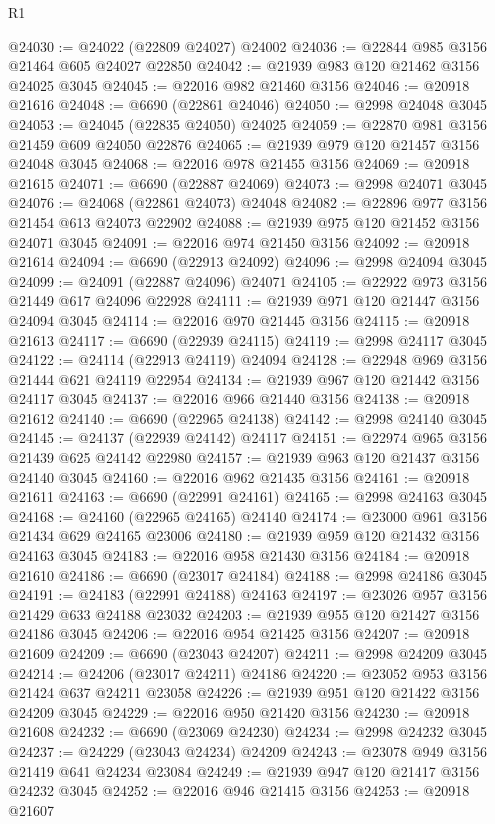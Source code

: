 \begin{lexlean}{R1}
\begin{coremodule}
@24030 := @24022 (@22809 @24027) @24002
@24036 := @22844 @985 @3156 @21464 @605 @24027 @22850
@24042 := @21939 @983 @120 @21462 @3156 @24025 @3045
@24045 := @22016 @982 @21460 @3156
@24046 := @20918 @21616
@24048 := @6690 (@22861 @24046)
@24050 := @2998 @24048 @3045
@24053 := @24045 (@22835 @24050) @24025
@24059 := @22870 @981 @3156 @21459 @609 @24050 @22876
@24065 := @21939 @979 @120 @21457 @3156 @24048 @3045
@24068 := @22016 @978 @21455 @3156
@24069 := @20918 @21615
@24071 := @6690 (@22887 @24069)
@24073 := @2998 @24071 @3045
@24076 := @24068 (@22861 @24073) @24048
@24082 := @22896 @977 @3156 @21454 @613 @24073 @22902
@24088 := @21939 @975 @120 @21452 @3156 @24071 @3045
@24091 := @22016 @974 @21450 @3156
@24092 := @20918 @21614
@24094 := @6690 (@22913 @24092)
@24096 := @2998 @24094 @3045
@24099 := @24091 (@22887 @24096) @24071
@24105 := @22922 @973 @3156 @21449 @617 @24096 @22928
@24111 := @21939 @971 @120 @21447 @3156 @24094 @3045
@24114 := @22016 @970 @21445 @3156
@24115 := @20918 @21613
@24117 := @6690 (@22939 @24115)
@24119 := @2998 @24117 @3045
@24122 := @24114 (@22913 @24119) @24094
@24128 := @22948 @969 @3156 @21444 @621 @24119 @22954
@24134 := @21939 @967 @120 @21442 @3156 @24117 @3045
@24137 := @22016 @966 @21440 @3156
@24138 := @20918 @21612
@24140 := @6690 (@22965 @24138)
@24142 := @2998 @24140 @3045
@24145 := @24137 (@22939 @24142) @24117
@24151 := @22974 @965 @3156 @21439 @625 @24142 @22980
@24157 := @21939 @963 @120 @21437 @3156 @24140 @3045
@24160 := @22016 @962 @21435 @3156
@24161 := @20918 @21611
@24163 := @6690 (@22991 @24161)
@24165 := @2998 @24163 @3045
@24168 := @24160 (@22965 @24165) @24140
@24174 := @23000 @961 @3156 @21434 @629 @24165 @23006
@24180 := @21939 @959 @120 @21432 @3156 @24163 @3045
@24183 := @22016 @958 @21430 @3156
@24184 := @20918 @21610
@24186 := @6690 (@23017 @24184)
@24188 := @2998 @24186 @3045
@24191 := @24183 (@22991 @24188) @24163
@24197 := @23026 @957 @3156 @21429 @633 @24188 @23032
@24203 := @21939 @955 @120 @21427 @3156 @24186 @3045
@24206 := @22016 @954 @21425 @3156
@24207 := @20918 @21609
@24209 := @6690 (@23043 @24207)
@24211 := @2998 @24209 @3045
@24214 := @24206 (@23017 @24211) @24186
@24220 := @23052 @953 @3156 @21424 @637 @24211 @23058
@24226 := @21939 @951 @120 @21422 @3156 @24209 @3045
@24229 := @22016 @950 @21420 @3156
@24230 := @20918 @21608
@24232 := @6690 (@23069 @24230)
@24234 := @2998 @24232 @3045
@24237 := @24229 (@23043 @24234) @24209
@24243 := @23078 @949 @3156 @21419 @641 @24234 @23084
@24249 := @21939 @947 @120 @21417 @3156 @24232 @3045
@24252 := @22016 @946 @21415 @3156
@24253 := @20918 @21607

\end{coremodule}
\end{lexlean}
